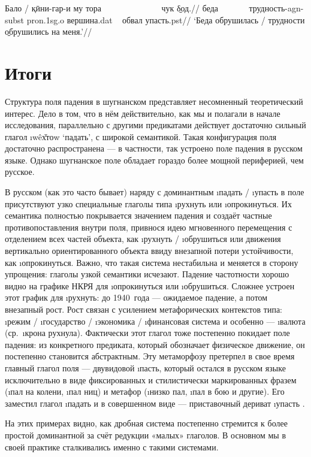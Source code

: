 \begingl
\gla Бало / қӣни-гар-и му тора ~~~~~~~~~~~~~ чук \b{δод}.//
\glc беда ~~~~~~ трудность-{\sc agn-subst} {\sc pron.1sg.o} вершина.{\sc dat} ~ обвал упасть.{\sc pst}//
\glft ‘Беда обрушилась / трудности \b{обрушились} на меня.’//
\endgl \xe

\section{Итоги} \label{down-conclusion}

Структура поля падения в шугнанском представляет несомненный теоретический интерес. Дело в том, что в нём действительно, как мы и полагали в начале исследования, параллельно с другими предикатами действует достаточно сильный глагол \i{wêх̌тоw} ‘падать’, с широкой семантикой. Такая конфигурация поля достаточно распространена — в частности, так устроено поле падения в русском языке. Однако шугнанское поле обладает гораздо более мощной периферией, чем русское.

В русском (как это часто бывает) наряду с доминантным \i{падать} / \i{упасть} в поле присутствуют узко специальные глаголы типа \i{рухнуть} или \i{опрокинуться}. Их семантика полностью покрывается значением падения и создаёт частные противопоставления внутри поля, привнося идею мгновенного перемещения с отделением всех частей объекта, как \i{рухнуть} / \i{обрушиться} или движения вертикально ориентированного объекта ввиду внезапной потери устойчивости, как \i{опрокинуться}. Важно, что такая система нестабильна и меняется в сторону упрощения: глаголы узкой семантики исчезают. Падение частотности хорошо видно на графике НКРЯ для \i{опрокинуться} или \i{обрушиться}. Сложнее устроен этот график для \i{рухнуть}: до 1940~года — ожидаемое падение, а потом внезапный рост. Рост связан с усилением метафорических контекстов типа: \i{режим} / \i{государство} / \i{экономика} / \i{финансовая система} и особенно — \i{валюта} (ср.~\i{крона рухнула}). Фактически этот глагол тоже постепенно покидает поле падения: из конкретного предиката, который обозначает физическое движение, он постепенно становится абстрактным. Эту метаморфозу претерпел в свое время главный глагол поля — двувидовой \i{пасть}, который остался в русском языке исключительно в виде фиксированных и стилистически маркированных фразем (\i{пал на колени}, \i{пал ниц}) и метафор (\i{низко пал}, \i{пал в бою} и другие). Его заместил глагол \i{падать} и в совершенном виде — приставочный дериват \i{упасть} \parencite{plungian2017}.

На этих примерах видно, как дробная система постепенно стремится к более простой доминантной за счёт редукции «малых» глаголов. В основном мы в своей практике сталкивались именно с такими системами.


